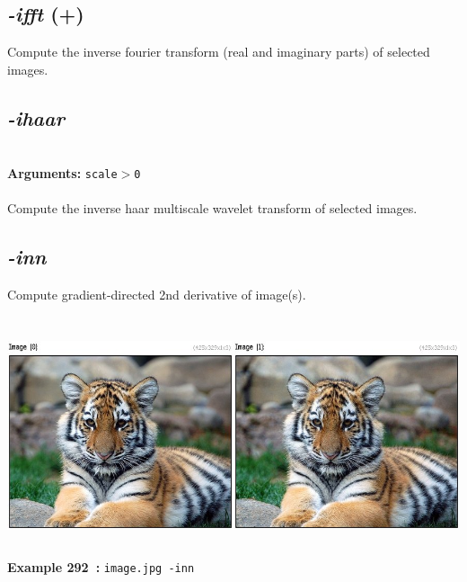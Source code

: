 \documentclass[a4paper,11pt,twoside]{book}
\begin{document}
\subsection{\emph{-ifft} (+)}\vspace*{-0.5em}
Compute the inverse fourier transform (real and imaginary parts) of selected images.


\subsection{\emph{-ihaar} }\vspace*{-0.5em}
~\\\textbf{Arguments: } 
{\small \texttt{scale$>$0}}\\~\\
Compute the inverse haar multiscale wavelet transform of selected images.


\subsection{\emph{-inn} }\vspace*{-0.5em}
Compute gradient-directed 2nd derivative of image(s).
\begin{center}\includegraphics[keepaspectratio=true,height=7cm,width=\textwidth]{img/gmic_def292.jpg}\\
{\footnotesize \textbf{Example 292~:} \texttt{image.jpg -inn}}
\end{center}
\end{document}
